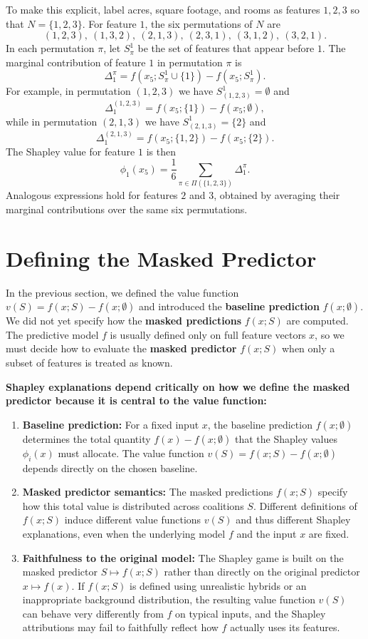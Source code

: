 \documentclass{article}
\begin{document}
To make this explicit, label acres, square footage, and rooms as features $1,2,3$ so that $N = \{1,2,3\}$.
For feature $1$, the six permutations of $N$ are
\[
(1,2,3),\ (1,3,2),\ (2,1,3),\ (2,3,1),\ (3,1,2),\ (3,2,1).
\]
In each permutation $\pi$, let $S_\pi^1$ be the set of features that appear before $1$.
The marginal contribution of feature $1$ in permutation $\pi$ is
\[
\Delta_1^\pi = f(x_5; S_\pi^1 \cup \{1\}) - f(x_5; S_\pi^1).
\]
For example, in permutation $(1,2,3)$ we have $S_{(1,2,3)}^1 = \emptyset$ and
\[
\Delta_1^{(1,2,3)} = f(x_5; \{1\}) - f(x_5; \emptyset),
\]
while in permutation $(2,1,3)$ we have $S_{(2,1,3)}^1 = \{2\}$ and
\[
\Delta_1^{(2,1,3)} = f(x_5; \{1,2\}) - f(x_5; \{2\}).
\]
The Shapley value for feature $1$ is then
\[
\phi_1(x_5) = \frac{1}{6} \sum_{\pi \in \Pi(\{1,2,3\})} \Delta_1^\pi.
\]
Analogous expressions hold for features $2$ and $3$, obtained by averaging their marginal contributions over the same six permutations.

\section{Defining the Masked Predictor}
In the previous section, we defined the value function $v(S) = f(x; S) - f(x; \emptyset)$ and introduced the \textbf{baseline prediction} $f(x; \emptyset)$.
We did not yet specify how the \textbf{masked predictions} $f(x; S)$ are computed.
The predictive model $f$ is usually defined only on full feature vectors $x$, so we must decide how to evaluate the \textbf{masked predictor} $f(x; S)$ when only a subset of features is treated as known.

\textbf{Shapley explanations depend critically on how we define the masked predictor because it is central to the value function:}
\begin{enumerate}
    \item \textbf{Baseline prediction:} For a fixed input $x$, the baseline prediction $f(x; \emptyset)$ determines the total quantity $f(x) - f(x; \emptyset)$ that the Shapley values $\phi_i(x)$ must allocate.
    The value function $v(S) = f(x; S) - f(x; \emptyset)$ depends directly on the chosen baseline.
    \item \textbf{Masked predictor semantics:} The masked predictions $f(x; S)$ specify how this total value is distributed across coalitions $S$.
    Different definitions of $f(x; S)$ induce different value functions $v(S)$ and thus different Shapley explanations, even when the underlying model $f$ and the input $x$ are fixed.
    \item \textbf{Faithfulness to the original model:} The Shapley game is built on the masked predictor $S \mapsto f(x; S)$ rather than directly on the original predictor $x \mapsto f(x)$.
    If $f(x; S)$ is defined using unrealistic hybrids or an inappropriate background distribution, the resulting value function $v(S)$ can behave very differently from $f$ on typical inputs, and the Shapley attributions may fail to faithfully reflect how $f$ actually uses its features.
\end{enumerate}
\end{document}
